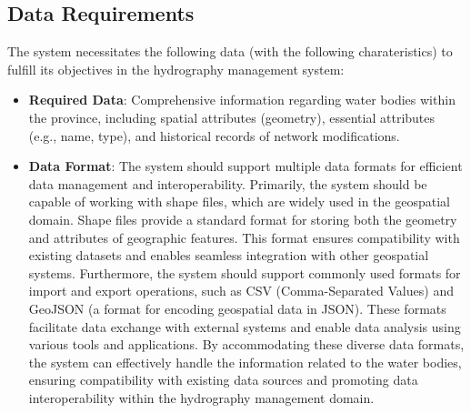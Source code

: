 \subsection{Data Requirements}
The system necessitates the following data (with the following charateristics) to fulfill its objectives in the hydrography management system:
\begin{itemize}
    \item \textbf{Required Data}: Comprehensive information regarding water bodies within the province, including spatial attributes (geometry), essential attributes (e.g., name, type), and historical records of network modifications.
    \item \textbf{Data Format}: The system should support multiple data formats for efficient data management and interoperability. Primarily, the system should be capable of working with shape files, which are widely used in the geospatial domain. Shape files provide a standard format for storing both the geometry and attributes of geographic features. This format ensures compatibility with existing datasets and enables seamless integration with other geospatial systems.
                                Furthermore, the system should support commonly used formats for import and export operations, such as CSV (Comma-Separated Values) and GeoJSON (a format for encoding geospatial data in JSON). These formats facilitate data exchange with external systems and enable data analysis using various tools and applications.
                                By accommodating these diverse data formats, the system can effectively handle the information related to the water bodies, ensuring compatibility with existing data sources and promoting data interoperability within the hydrography management domain.
\end{itemize}


